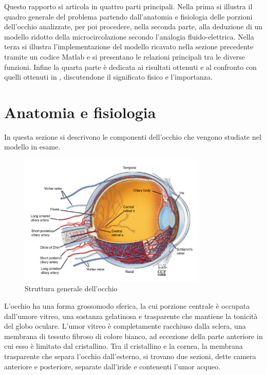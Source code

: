 \documentclass{article}
\begin{document}
Questo rapporto si articola in quattro parti principali.
Nella prima si illustra il quadro generale del problema partendo dall'anatomia e fisiologia delle porzioni dell'occhio analizzate, per poi procedere, nella seconda parte, alla deduzione di un modello ridotto della microcircolazione secondo l'analogia fluido-elettrica.
Nella terza si illustra l'implementazione del modello ricavato nella sezione precedente tramite un codice Matlab e si presentano le relazioni principali tra le diverse funzioni.
Infine la quarta parte è dedicata ai risultati ottenuti e al confronto con quelli ottenuti in \cite{art1}, discutendone il significato fisico e l'importanza.


\section{Anatomia e fisiologia}
In questa sezione si descrivono le componenti dell'occhio che vengono studiate nel modello in esame.
\begin{figure}[h]
\begin{center}
\includegraphics[width=0.8\textwidth]{Pictures/occhio.png}
\caption{Struttura generale dell'occhio \cite{Tesi}}
\label{eyeball}
\end{center}
\end{figure}
L'occhio ha una forma grossomodo sferica, la cui porzione centrale è occupata dall'umore vitreo, una sostanza gelatinosa e trasparente che mantiene la tonicità del globo oculare. 
L'umor vitreo è completamente racchiuso dalla sclera, una membrana di tessuto fibroso di colore bianco, ad eccezione della parte anteriore in cui esso è limitato dal cristallino.
Tra il cristallino e la cornea, la membrana trasparente che separa l'occhio dall'esterno, si trovano due sezioni, dette camera anteriore e posteriore, separate dall'iride e contenenti l'umor acqueo.
\end{document}
